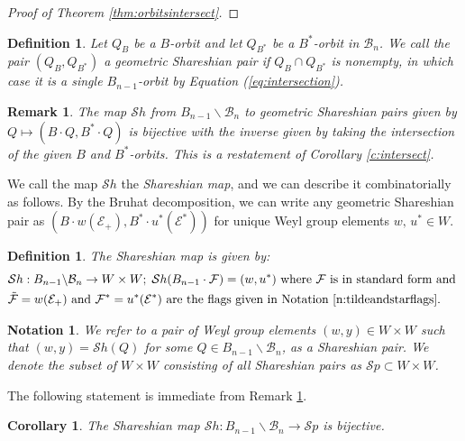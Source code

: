 \documentclass[12pt]{amsart}
\numberwithin{equation}{section}
\newtheorem{cor}[thm]{Corollary}
\newtheorem{rem}[thm]{Remark}
\newtheorem{nota}[thm]{Notation}
\newtheorem{dfn}[thm]{Definition}
\newcommand{\B}{\mathcal{B}}
\newcommand{\F}{\mathcal{F}}
\newcommand{\Borbitspace}{B_{n-1}\backslash\B_{n}}
\newcommand{\Sh}{\mathcal{S}h}
\newcommand{\Sp}{\mathcal{S}p}
\begin{document}
\begin{proof}[Proof of Theorem \ref{thm:orbitsintersect}]


 
 
\end{proof}

\begin{dfn}\label{d:geoShpair}
Let $Q_B$ be a $B$-orbit and let $Q_{B^*}$ be a $B^*$-orbit in $\B_n$.  We call the pair $(Q_B,Q_{B^*})$ a {\it geometric Shareshian pair} if $Q_B \cap Q_{B^*}$ is nonempty, in which case it is a single $B_{n-1}$-orbit by Equation (\ref{eq:intersection}).
\end{dfn}

\begin{rem}\label{r:geoshar}
The map $\Sh$ from $B_{n-1}\backslash \B_n$ to geometric Shareshian pairs given by $Q\mapsto (B\cdot Q, B^*\cdot Q)$ is bijective with the inverse given by taking the intersection of the given $B$ and $B^{*}$-orbits.  This is a restatement of Corollary \ref{c:intersect}.
\end{rem}

We call the map $\Sh$ the {\it Shareshian map}, and we can describe it combinatorially as follows.   By the Bruhat decomposition, we can write any geometric Shareshian pair as $(B\cdot w(\mathcal{E}_{+}),B^*\cdot u^{*}(\mathcal{E}^{*}))$ for unique Weyl group elements $w,\, u^{*}\in W$.%
\begin{dfn}\label{d:SHmap}
The Shareshian map is given by:
\begin{equation}\label{eq:Shmap}
\begin{split}
&\Sh: \Borbitspace\to W\times W; \;\Sh(B_{n-1}\cdot\F)=(w,u^{*})\mbox{ where } \F \mbox{ is in standard form and }\\
& \tilde{\F}=w(\mathcal{E}_{+})
\mbox{ and }\F^{*}=u^{*}(\mathcal{E}^{*})\mbox{ are the flags given in Notation \ref{n:tildeandstarflags}.}
\end{split}
\end{equation}
\end{dfn}

\begin{nota}\label{d:Shpair}
 We refer to a pair of Weyl group 
elements $(w,y)\in W\times W$ such that $(w,y)=\Sh(Q)$ for some $Q\in \Borbitspace$,  as a \emph{Shareshian pair}.  We denote the subset of $W\times W$ consisting of all Shareshian pairs as $\Sp\subset W\times W$.  
\end{nota}
\noindent The following statement is immediate from Remark \ref{r:geoshar}.
\begin{cor}\label{c:Shpair}
The Shareshian map $\Sh:B_{n-1}\backslash \B_n \to \Sp$ is bijective.
\end{cor}
\end{document}
